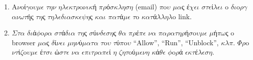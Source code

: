 \documentclass[a4paper,11pt,english]{sphinxmanual}
\begin{document}
\begin{description}
\begin{enumerate}
\item {} 
A\(\nu\)oί\(\gamma\)o\(\upsilon\)\(\mu\)\(\epsilon\) \(\tau\)\(\eta\)\(\nu\) \(\eta\)\(\lambda\)\(\epsilon\)\(\kappa\)\(\tau\)\(\rho\)o\(\nu\)\(\iota\)\(\kappa\)ή \(\pi\)\(\rho\)ό\(\sigma\)\(\kappa\)\(\lambda\)\(\eta\)\(\sigma\)\(\eta\) (email) \(\pi\)o\(\upsilon\) \(\mu\)\(\alpha\)ς έ\(\chi\)\(\epsilon\)\(\iota\) \(\sigma\)\(\tau\)\(\epsilon\)ί\(\lambda\)\(\epsilon\)\(\iota\) o \(\delta\)\(\iota\)o\(\rho\)\(\gamma\)\(\alpha\)\(\nu\)\(\omega\)\(\tau\)ής \(\tau\)\(\eta\)ς \(\tau\)\(\eta\)\(\lambda\)\(\epsilon\)\(\delta\)\(\iota\)\(\alpha\)\(\sigma\)\(\kappa\)\(\epsilon\)\(\psi\)\(\eta\)ς \(\kappa\)\(\alpha\)\(\iota\) \(\pi\)\(\alpha\)\(\tau\)ά\(\mu\)\(\epsilon\) \(\tau\)o \(\kappa\)\(\alpha\)\(\tau\)ά\(\lambda\)\(\lambda\)\(\eta\)\(\lambda\)o link.

\item {} 
\(\Sigma\)\(\tau\)\(\alpha\) \(\delta\)\(\iota\)ά\(\phi\)o\(\rho\)\(\alpha\) \(\sigma\)\(\tau\)ά\(\delta\)\(\iota\)\(\alpha\) \(\tau\)\(\eta\)ς \(\sigma\)ύ\(\nu\)\(\delta\)\(\epsilon\)\(\sigma\)\(\eta\)ς \(\theta\)\(\alpha\) \(\pi\)\(\rho\)έ\(\pi\)\(\epsilon\) \(\nu\)\(\alpha\) \(\pi\)\(\alpha\)\(\rho\)\(\alpha\)\(\tau\)\(\eta\)\(\rho\)ή\(\sigma\)o\(\upsilon\)\(\mu\)\(\epsilon\) \(\mu\)ή\(\pi\)\(\omega\)ς o browser \(\mu\)\(\alpha\)ς \(\delta\)ί\(\nu\)\(\epsilon\)\(\iota\) \(\mu\)\(\eta\)\(\nu\)ύ\(\mu\)\(\alpha\)\(\tau\)\(\alpha\) \(\tau\)o\(\upsilon\) \(\tau\)ύ\(\pi\)o\(\upsilon\) “Allow”, “Run”, “Unblock”, \(\kappa\)\(\lambda\)\(\pi\). \(\Phi\)\(\rho\)o\(\nu\)\(\tau\)ί\(\zeta\)o\(\upsilon\)\(\mu\)\(\epsilon\) έ\(\tau\)\(\sigma\)\(\iota\) ώ\(\sigma\)\(\tau\)\(\epsilon\) \(\nu\)\(\alpha\) \(\epsilon\)\(\pi\)\(\iota\)\(\tau\)\(\rho\)\(\alpha\)\(\pi\)\(\epsilon\)ί \(\eta\) \(\zeta\)\(\eta\)\(\tau\)oύ\(\mu\)\(\epsilon\)\(\nu\)\(\eta\) \(\kappa\)ά\(\theta\)\(\epsilon\) \(\phi\)o\(\rho\)ά \(\epsilon\)\(\kappa\)\(\tau\)έ\(\lambda\)\(\epsilon\)\(\sigma\)\(\eta\).


\end{enumerate}
\end{description}
\end{document}
